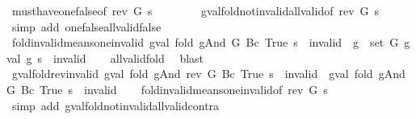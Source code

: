 \begin{isabellebody}
\ must{\isacharunderscore}have{\isacharunderscore}one{\isacharunderscore}false{\isacharbrackleft}of\ {\isachardoublequoteopen}rev\ G{\isachardoublequoteclose}\ s{\isacharbrackright}\isanewline
\ \ \ \ \ \ \ \ gval{\isacharunderscore}fold{\isacharunderscore}not{\isacharunderscore}invalid{\isacharunderscore}all{\isacharunderscore}valid{\isacharbrackleft}of\ {\isachardoublequoteopen}rev\ G{\isachardoublequoteclose}\ s{\isacharbrackright}\isanewline
\ \ \isamarkupfalse%
\ {\isacharparenleft}simp\ add{\isacharcolon}\ one{\isacharunderscore}false{\isacharunderscore}all{\isacharunderscore}valid{\isacharunderscore}false{\isacharparenright}%
\endisatagproof
{\isafoldproof}%
%
\isadelimproof
\isanewline
%
\endisadelimproof
\isanewline
{}\isamarkupfalse%
\ fold{\isacharunderscore}invalid{\isacharunderscore}means{\isacharunderscore}one{\isacharunderscore}invalid{\isacharcolon}\ {\isachardoublequoteopen}gval\ {\isacharparenleft}fold\ gAnd\ G\ {\isacharparenleft}Bc\ True{\isacharparenright}{\isacharparenright}\ s\ {\isacharequal}\ invalid\ {\isasymLongrightarrow}\ {\isasymexists}g\ {\isasymin}\ set\ G{\isachardot}\ gval\ g\ s\ {\isacharequal}\ invalid{\isachardoublequoteclose}\isanewline
%
\isadelimproof
\ \ %
\endisadelimproof
%
\isatagproof
{}\isamarkupfalse%
\ all{\isacharunderscore}valid{\isacharunderscore}fold\ \isamarkupfalse%
\ blast%
\endisatagproof
{\isafoldproof}%
%
\isadelimproof
\isanewline
%
\endisadelimproof
\isanewline
{}\isamarkupfalse%
\ gval{\isacharunderscore}fold{\isacharunderscore}rev{\isacharunderscore}invalid{\isacharcolon}\ {\isachardoublequoteopen}gval\ {\isacharparenleft}fold\ gAnd\ {\isacharparenleft}rev\ G{\isacharparenright}\ {\isacharparenleft}Bc\ True{\isacharparenright}{\isacharparenright}\ s\ {\isacharequal}\ invalid\ {\isasymLongrightarrow}\ gval\ {\isacharparenleft}fold\ gAnd\ G\ {\isacharparenleft}Bc\ True{\isacharparenright}{\isacharparenright}\ s\ {\isacharequal}\ invalid{\isachardoublequoteclose}\isanewline
%
\isadelimproof
\ \ %
\endisadelimproof
%
\isatagproof
{}\isamarkupfalse%
\ fold{\isacharunderscore}invalid{\isacharunderscore}means{\isacharunderscore}one{\isacharunderscore}invalid{\isacharbrackleft}of\ {\isachardoublequoteopen}rev\ G{\isachardoublequoteclose}\ s{\isacharbrackright}\isanewline
\ \ \isamarkupfalse%
\ {\isacharparenleft}simp\ add{\isacharcolon}\ gval{\isacharunderscore}fold{\isacharunderscore}not{\isacharunderscore}invalid{\isacharunderscore}all{\isacharunderscore}valid{\isacharunderscore}contra{\isacharparenright}%

\end{isabellebody}
